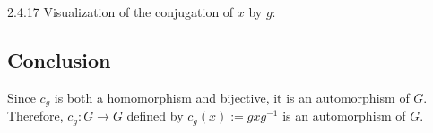 \documentclass[12pt]{amsart}
\theoremstyle{definition}
\numberwithin{equation}{section}
\begin{document}
\begin{exercise}{2.4.17}
    Visualization of the conjugation of \(x\) by \(g\):

    \begin{center}
    \end{center}
    
    \subsection*{Conclusion}
    
    Since \(c_g\) is both a homomorphism and bijective, it is an automorphism of \(G\). Therefore, \(c_g: G \rightarrow G\) defined by \(c_g(x) := gxg^{-1}\) is an automorphism of \(G\).
    
\end{exercise}
\newpage
\end{document}
